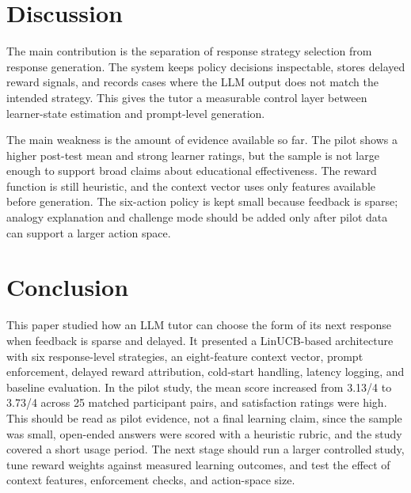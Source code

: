 \documentclass[conference]{IEEEtran}
\begin{document}
\section{Discussion}

The main contribution is the separation of response strategy selection from response generation. The system keeps policy decisions inspectable, stores delayed reward signals, and records cases where the LLM output does not match the intended strategy. This gives the tutor a measurable control layer between learner-state estimation and prompt-level generation.

The main weakness is the amount of evidence available so far. The pilot shows a higher post-test mean and strong learner ratings, but the sample is not large enough to support broad claims about educational effectiveness. The reward function is still heuristic, and the context vector uses only features available before generation. The six-action policy is kept small because feedback is sparse; analogy explanation and challenge mode should be added only after pilot data can support a larger action space.

\section{Conclusion}

This paper studied how an LLM tutor can choose the form of its next response when feedback is sparse and delayed. It presented a LinUCB-based architecture with six response-level strategies, an eight-feature context vector, prompt enforcement, delayed reward attribution, cold-start handling, latency logging, and baseline evaluation. In the pilot study, the mean score increased from 3.13/4 to 3.73/4 across 25 matched participant pairs, and satisfaction ratings were high. This should be read as pilot evidence, not a final learning claim, since the sample was small, open-ended answers were scored with a heuristic rubric, and the study covered a short usage period. The next stage should run a larger controlled study, tune reward weights against measured learning outcomes, and test the effect of context features, enforcement checks, and action-space size.
\end{document}
